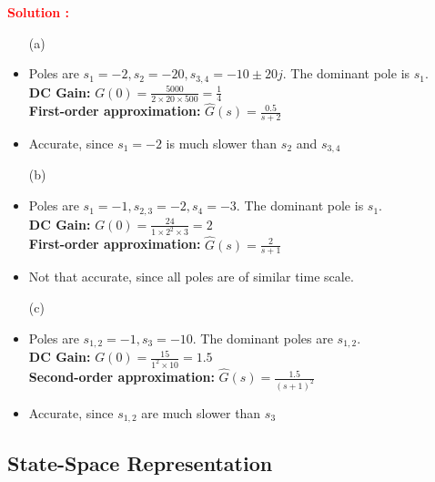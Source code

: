 \documentclass[12pt]{article}
\begin{document}
\textbf{\textcolor{red}{Solution :}}
\begin{itemize}
    \item[(a)] 
    \item Poles are \(s_1 = -2,s_2 = -20,s_{3,4} = -10 \pm 20 j\). The dominant pole is \(s_1\). \\
    \textbf{DC Gain:} \(G(0) = \frac{5000}{2\times20 \times 500} = \frac{1}{4} \) \\
    \textbf{First-order approximation:} \(\hat{G}(s) = \frac{0.5}{s+2}\)
    \item Accurate, since \(s_1 = -2\) is much slower than \(s_2\) and \(s_{3,4}\) 
    \item[(b)]
    \item Poles are \(s_1 = -1,s_{2,3} = -2,s_4 = -3 \). The dominant pole is \(s_1\). \\
    \textbf{DC Gain:} \(G(0) = \frac{24}{1\times2^2 \times 3} = 2 \) \\
    \textbf{First-order approximation:} \(\hat{G}(s) = \frac{2}{s+1}\)
    \item Not that accurate, since all poles are of similar time scale. 
    \item[(c)]
    \item Poles are \(s_{1,2} = -1,s_3 = -10\). The dominant poles are \(s_{1,2}\). \\
    \textbf{DC Gain:} \(G(0) = \frac{15}{1^2\times 10} = 1.5 \) \\
    \textbf{Second-order approximation:} \(\hat{G}(s) = \frac{1.5}{(s+1)^2}\)
    \item Accurate, since \(s_{1,2}\) are much slower than \(s_3\) 
\end{itemize}
\clearpage

\subsection{State-Space Representation}
\end{document}
